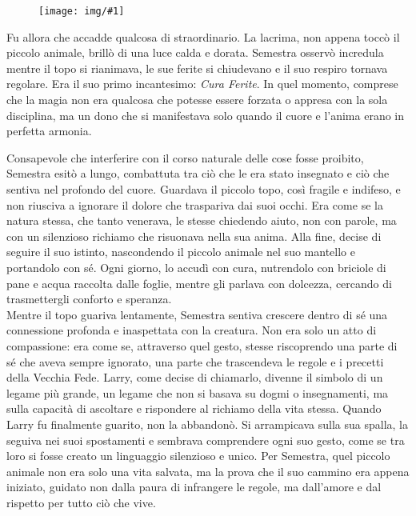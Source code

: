 \documentclass[letterpaper,twocolumn,openany,nodeprecatedcode]{dndbook}
\newcommand{\image}[3]{%
  \begin{figure}[#3]
    \begin{tcolorbox}[
        enhanced,
        colframe=PhbTan,
        colback=white,
        opacityback=0,
        title={\vspace{0.2cm}\centering \sc  \textbf{#2}\vspace{0.2cm}},
        colbacktitle=PhbTan!50!PhbLightCyan,
        coltitle=black,
        fonttitle=\bfseries
    ]
    \texttt{[image: img/\#1]}
    \end{tcolorbox}
  \end{figure}
}
\begin{document}
\image{semestra_larry-1.jpeg}{Semestra e Larry}{h!}

Fu allora che accadde qualcosa di straordinario. La lacrima, non appena toccò il piccolo animale, brillò di una luce calda e dorata. Semestra osservò incredula mentre il topo si rianimava, le sue ferite si chiudevano e il suo respiro tornava regolare. Era il suo primo incantesimo: \textit{Cura Ferite}. In quel momento, comprese che la magia non era qualcosa che potesse essere forzata o appresa con la sola disciplina, ma un dono che si manifestava solo quando il cuore e l’anima erano in perfetta armonia.

Consapevole che interferire con il corso naturale delle cose fosse proibito, Semestra esitò a lungo, combattuta tra ciò che le era stato insegnato e ciò che sentiva nel profondo del cuore. Guardava il piccolo topo, così fragile e indifeso, e non riusciva a ignorare il dolore che traspariva dai suoi occhi. Era come se la natura stessa, che tanto venerava, le stesse chiedendo aiuto, non con parole, ma con un silenzioso richiamo che risuonava nella sua anima. Alla fine, decise di seguire il suo istinto, nascondendo il piccolo animale nel suo mantello e portandolo con sé. Ogni giorno, lo accudì con cura, nutrendolo con briciole di pane e acqua raccolta dalle foglie, mentre gli parlava con dolcezza, cercando di trasmettergli conforto e speranza.\\
Mentre il topo guariva lentamente, Semestra sentiva crescere dentro di sé una connessione profonda e inaspettata con la creatura. Non era solo un atto di compassione: era come se, attraverso quel gesto, stesse riscoprendo una parte di sé che aveva sempre ignorato, una parte che trascendeva le regole e i precetti della Vecchia Fede. Larry, come decise di chiamarlo, divenne il simbolo di un legame più grande, un legame che non si basava su dogmi o insegnamenti, ma sulla capacità di ascoltare e rispondere al richiamo della vita stessa. Quando Larry fu finalmente guarito, non la abbandonò. Si arrampicava sulla sua spalla, la seguiva nei suoi spostamenti e sembrava comprendere ogni suo gesto, come se tra loro si fosse creato un linguaggio silenzioso e unico. Per Semestra, quel piccolo animale non era solo una vita salvata, ma la prova che il suo cammino era appena iniziato, guidato non dalla paura di infrangere le regole, ma dall’amore e dal rispetto per tutto ciò che vive.
\end{document}
